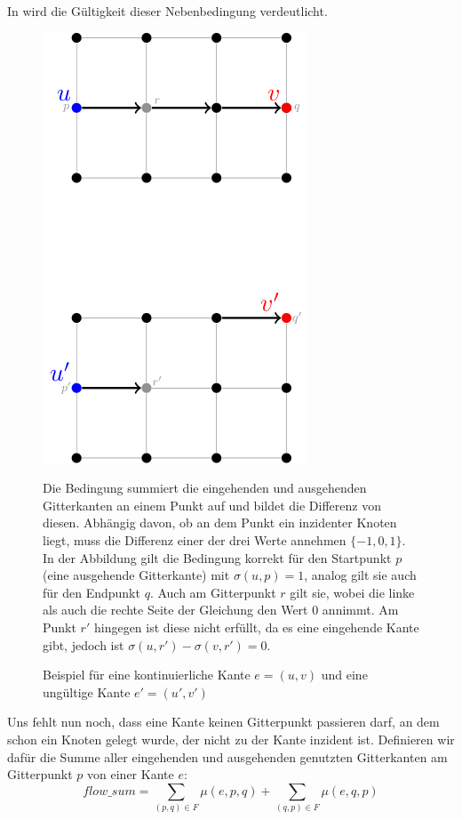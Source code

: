 \documentclass[bachelor, german]{algothesis}
\begin{document}
In  wird die Gültigkeit dieser Nebenbedingung verdeutlicht.
\begin{figure}[H]
    \begin{minipage}{0.5\textwidth}
    \centering
    \includegraphics{figures/Kontinuierlich.png}
    \caption{Beispiel für eine kontinuierliche Kante $e=(u,v)$ und eine ungültige Kante $e'=(u',v')$}
    \label{fig:Kontinuierlich}
    \end{minipage}
    \begin{minipage}{0.47\textwidth}
    \small
    Die Bedingung summiert die eingehenden und ausgehenden Gitterkanten an einem Punkt auf und bildet die Differenz von diesen. Abhängig davon, ob an dem Punkt ein inzidenter Knoten liegt, muss die Differenz einer der drei Werte annehmen $\{-1,0,1\}$.\newline
    In der Abbildung gilt die Bedingung korrekt für den Startpunkt $p$ (eine ausgehende Gitterkante) mit $\sigma(u,p) = 1$, analog gilt sie auch für den Endpunkt $q$. Auch am Gitterpunkt $r$ gilt sie, wobei die linke als auch die rechte Seite der Gleichung den Wert 0 annimmt. Am Punkt $r'$ hingegen ist diese nicht erfüllt, da es eine eingehende Kante gibt, jedoch ist $\sigma(u,r') - \sigma(v,r') = 0$.

    \end{minipage}
\end{figure}
Uns fehlt nun noch, dass eine Kante keinen Gitterpunkt passieren darf, an dem schon ein Knoten gelegt wurde, der nicht zu der Kante inzident ist. Definieren wir dafür die Summe aller eingehenden und ausgehenden genutzten Gitterkanten am Gitterpunkt $p$ von einer Kante $e$: $$flow\_sum = \sum_{(p,q) \in F} \mu(e,p,q) + \sum_{(q,p) \in F} \mu(e,q,p)$$
\end{document}
